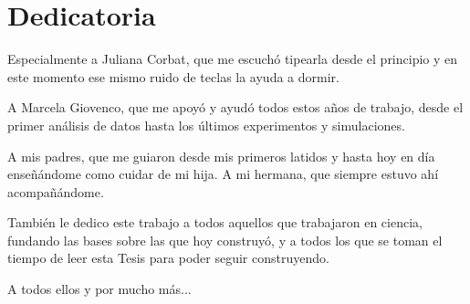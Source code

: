 \chapter*{Dedicatoria}


Especialmente a Juliana Corbat, que me escuchó tipearla desde el principio y en este momento ese mismo ruido de teclas la ayuda a dormir.

A Marcela Giovenco, que me apoyó y ayudó todos estos años de trabajo, desde el primer análisis de datos hasta los últimos experimentos y simulaciones.

A mis padres, que me guiaron desde mis primeros latidos y hasta hoy en día enseñándome como cuidar de mi hija. A mi hermana, que siempre estuvo ahí acompañándome. 

También le dedico este trabajo a todos aquellos que trabajaron en ciencia, fundando las bases sobre las que hoy construyó, y a todos los que se toman el tiempo de leer esta Tesis para poder seguir construyendo.

A todos ellos y por mucho más...